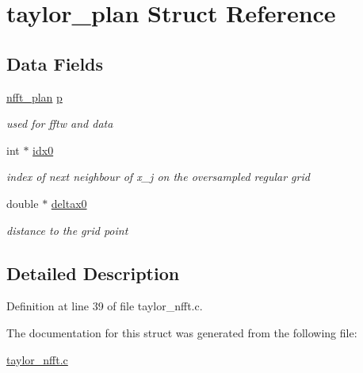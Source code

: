 \hypertarget{structtaylor__plan}{
\section{taylor\_\-plan Struct Reference}
\label{structtaylor__plan}
}
\subsection*{Data Fields}
\begin{CompactItemize}
\item 
\hypertarget{structtaylor__plan_fd71182be8b8fcfa66155b0be4fb94ee}{
\hyperlink{structnfft__plan}{nfft\_\-plan} \hyperlink{structtaylor__plan_fd71182be8b8fcfa66155b0be4fb94ee}{p}}
\label{structtaylor__plan_fd71182be8b8fcfa66155b0be4fb94ee}

\begin{CompactList}\small\item\em used for fftw and data \item\end{CompactList}\item 
\hypertarget{structtaylor__plan_3d3e69bc61775fee556801bd66a47c19}{
int $\ast$ \hyperlink{structtaylor__plan_3d3e69bc61775fee556801bd66a47c19}{idx0}}
\label{structtaylor__plan_3d3e69bc61775fee556801bd66a47c19}

\begin{CompactList}\small\item\em index of next neighbour of x\_\-j on the oversampled regular grid \item\end{CompactList}\item 
\hypertarget{structtaylor__plan_09164bdbcba8f9ecc7a58904574ff07b}{
double $\ast$ \hyperlink{structtaylor__plan_09164bdbcba8f9ecc7a58904574ff07b}{deltax0}}
\label{structtaylor__plan_09164bdbcba8f9ecc7a58904574ff07b}

\begin{CompactList}\small\item\em distance to the grid point \item\end{CompactList}\end{CompactItemize}


\subsection{Detailed Description}


Definition at line 39 of file taylor\_\-nfft.c.

The documentation for this struct was generated from the following file:\begin{CompactItemize}
\item 
\hyperlink{taylor__nfft_8c}{taylor\_\-nfft.c}\end{CompactItemize}

